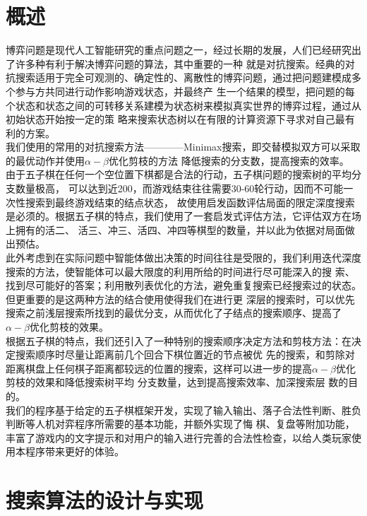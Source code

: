 \documentclass{acm_proc_article-sp}
\begin{document}
\section{\textbf{概述}}
博弈问题是现代人工智能研究的重点问题之一，经过长期的发展，人们已经研究出了许多种有利于解决博弈问题的算法，其中重要的一种
就是对抗搜索。经典的对抗搜索适用于完全可观测的、确定性的、离散性的博弈问题，通过把问题建模成多个参与方共同进行动作影响游戏状态，并最终产
生一个结果的模型，把问题的每个状态和状态之间的可转移关系建模为状态树来模拟真实世界的博弈过程，通过从初始状态开始按一定的策
略来搜索状态树以在有限的计算资源下寻求对自己最有利的方案。\\
我们使用的常用的对抗搜索方法————Minimax搜索，即交替模拟双方可以采取的最优动作并使用$\alpha-\beta$优化剪枝的方法
降低搜索的分支数，提高搜索的效率。\\
由于五子棋在任何一个空位置下棋都是合法的行动，五子棋问题的搜索树的平均分支数量极高，
可以达到近200，而游戏结束往往需要30-60轮行动，因而不可能一次性搜索到最终游戏结束的结点状态，
故使用启发函数评估局面的限定深度搜索是必须的。根据五子棋的特点，我们使用了一套启发式评估方法，它评估双方在场上拥有的活二、
活三、冲三、活四、冲四等棋型的数量，并以此为依据对局面做出预估。\\
此外考虑到在实际问题中智能体做出决策的时间往往是受限的，我们利用迭代深度搜索的方法，使智能体可以最大限度的利用所给的时间进行尽可能深入的搜
索、找到尽可能好的答案；利用散列表优化的方法，避免重复搜索已经搜索过的状态。但更重要的是这两种方法的结合使用使得我们在进行更
深层的搜索时，可以优先搜索之前浅层搜索所找到的最优分支，从而优化了子结点的搜索顺序、提高了$\alpha-\beta$优化剪枝的效果。\\
根据五子棋的特点，我们还引入了一种特别的搜索顺序决定方法和剪枝方法：在决定搜索顺序时尽量让距离前几个回合下棋位置近的节点被优
先的搜索，和剪除对距离棋盘上任何棋子距离都较远的位置的搜索，这样可以进一步的提高$\alpha-\beta$优化剪枝的效果和降低搜索树平均
分支数量，达到提高搜索效率、加深搜索层 数的目的。\\
我们的程序基于给定的五子棋框架开发，实现了输入输出、落子合法性判断、胜负判断等人机对弈程序所需要的基本功能，并额外实现了悔
棋、复盘等附加功能，丰富了游戏内的文字提示和对用户的输入进行完善的合法性检查，以给人类玩家使用本程序带来更好的体验。\\

\section{\textbf{搜索算法的设计与实现}}
\end{document}
